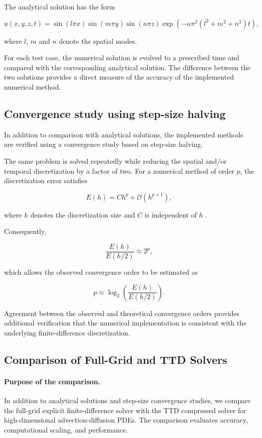 \documentclass[11pt,a4paper,parskip=half-]{scrartcl}
\theoremstyle{definition}
\theoremstyle{plain}
\theoremstyle{remark}
\begin{document}
The analytical solution has the form

\[
u(x,y,z,t)
=
\sin(l\pi x)
\sin(m\pi y)
\sin(n\pi z)
\exp\!\left(
-\alpha\pi^2
(l^2+m^2+n^2)t
\right),
\]

where $l$, $m$ and $n$ denote the spatial modes.

For each test case, the numerical solution is evolved to a prescribed
time and compared with the corresponding analytical solution. The
difference between the two solutions provides a direct measure of the
accuracy of the implemented numerical method.

\subsection{Convergence study using step-size halving}

In addition to comparison with analytical solutions, the implemented
methods are verified using a convergence study based on step-size
halving.

The same problem is solved repeatedly while reducing the spatial and/or
temporal discretization by a factor of two. For a numerical method of
order $p$, the discretization error satisfies

\[
E(h)
=
Ch^p
+
\mathcal{O}(h^{p+1}),
\]

where $h$ denotes the discretization size and $C$ is independent of
$h$ \cite{LeVeque2007}.

Consequently,

\[
\frac{E(h)}
     {E(h/2)}
\approx
2^p,
\]

which allows the observed convergence order to be estimated as

\[
p
\approx
\log_2
\left(
\frac{E(h)}
     {E(h/2)}
\right).
\]

Agreement between the observed and theoretical convergence orders
provides additional verification that the numerical implementation is
consistent with the underlying finite-difference discretization.

\subsection{Comparison of Full-Grid and TTD Solvers}
\label{sec:solver_comparison}

\paragraph{Purpose of the comparison.}
In addition to analytical solutions and step-size convergence studies, we
compare the full-grid explicit finite-difference solver with the TTD
compressed solver for high-dimensional advection-diffusion PDEs. The
comparison evaluates accuracy, computational scaling, and performance.
\end{document}
